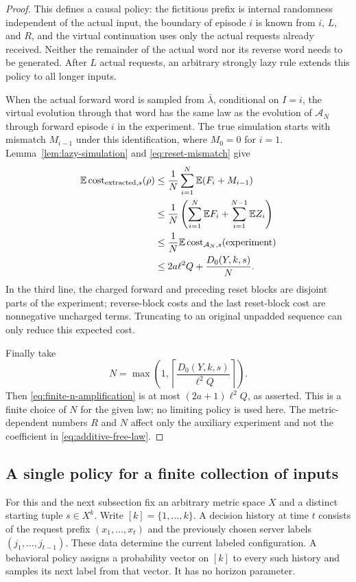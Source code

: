\begin{proof}
This defines a causal policy: the fictitious prefix is internal
randomness independent of the actual input, the boundary of episode
$i$ is known from $i$, $L$, and $R$, and the virtual continuation uses
only the actual requests already received.  Neither the remainder of
the actual word nor its reverse word needs to be generated.  After
$L$ actual requests, an arbitrary strongly lazy rule extends this
policy to all longer inputs.

When the actual forward word is sampled from $\bar\lambda$,
conditional on $I=i$, the virtual evolution through that word has the
same law as the evolution of $\mathcal A_N$ through forward episode
$i$ in the experiment.  The true simulation starts with mismatch
$M_{i-1}$ under this identification, where $M_0=0$ for $i=1$.
Lemma~\ref{lem:lazy-simulation} and \eqref{eq:reset-mismatch} give
\begin{align}
 \mathbb E\operatorname{cost}_{\mathrm{extracted},s}(\rho)
 &\le \frac1N\sum_{i=1}^N\mathbb E(F_i+M_{i-1}) \notag\\
 &\le \frac1N\left(\sum_{i=1}^N\mathbb E F_i
                    +\sum_{i=1}^{N-1}\mathbb E Z_i\right) \notag\\
 &\le \frac1N\mathbb E\operatorname{cost}_{\mathcal A_N,s}(\text{experiment}) \notag\\
 &\le 2a\ell^2Q+\frac{D_0(Y,k,s)}N.
 \label{eq:finite-n-amplification}
\end{align}
In the third line, the charged forward and preceding reset blocks are
disjoint parts of the experiment; reverse-block costs and the last
reset-block cost are nonnegative uncharged terms.  Truncating to an
original unpadded sequence can only reduce this expected cost.

Finally take
\[
 N=\max\left(1,
      \left\lceil\frac{D_0(Y,k,s)}{\ell^2Q}\right\rceil\right).
\]
Then \eqref{eq:finite-n-amplification} is at most
$(2a+1)\ell^2Q$, as asserted.  This is a finite choice of $N$ for the
given law; no limiting policy is used here.  The metric-dependent
numbers $R$ and $N$ affect only the auxiliary experiment and not the
coefficient in \eqref{eq:additive-free-law}.
\end{proof}

\subsection{A single policy for a finite collection of inputs}

For this and the next subsection fix an arbitrary metric space $X$
and a distinct starting tuple $s\in X^k$.  Write $[k]=\{1,\ldots,k\}$.
A decision history at time $t$ consists of the request prefix
$(x_1,\ldots,x_t)$ and the previously chosen server labels
$(j_1,\ldots,j_{t-1})$.  These data determine the current labeled
configuration.  A behavioral policy assigns a probability vector on
$[k]$ to every such history and samples its next label from that vector.
It has no horizon parameter.

